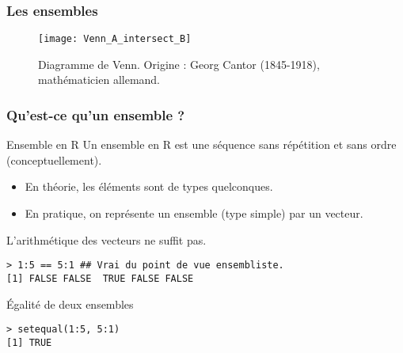 \documentclass[10pt]{beamer}
\begin{document}
\begin{frame}
  \frametitle{Les ensembles}
  \begin{figure}[t]
    \centering
    \texttt{[image: Venn\_A\_intersect\_B]}
    \caption{Diagramme de Venn. \newline Origine : Georg Cantor (1845-1918), mathématicien allemand. }
  \end{figure}
\end{frame}

\begin{frame}[fragile]
  \frametitle{Qu'est-ce qu'un ensemble ?}

  \begin{alertblock}{Ensemble en R}
    Un ensemble en R est une séquence sans répétition et sans ordre (conceptuellement).
    \begin{itemize}
    \item En théorie, les éléments sont de types quelconques.
    \item En pratique, on représente un ensemble (type simple) par un vecteur.
    \end{itemize}
\end{alertblock}



  \begin{exampleblock}{L'arithmétique des vecteurs ne suffit pas.}
    \begin{lstlisting}[style=block]
> 1:5 == 5:1 ## Vrai du point de vue ensembliste.
[1] FALSE FALSE  TRUE FALSE FALSE
    \end{lstlisting}
  \end{exampleblock}


  \begin{block}{Égalité de deux ensembles}
    \begin{lstlisting}[style=block]
> setequal(1:5, 5:1)
[1] TRUE
    \end{lstlisting}
  \end{block}
\end{frame}
\end{document}
